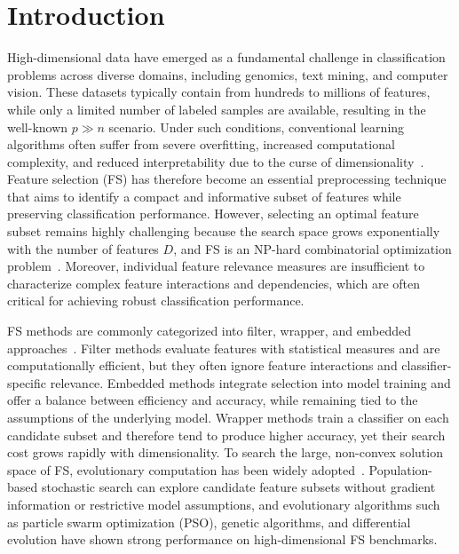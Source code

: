 \section{Introduction}\label{sec:introduction}

High-dimensional data have emerged as a fundamental challenge in classification problems across diverse domains, including genomics, text mining, and computer vision. These datasets typically contain from hundreds to millions of features, while only a limited number of labeled samples are available, resulting in the well-known \(p \gg n\) scenario. Under such conditions, conventional learning algorithms often suffer from severe overfitting, increased computational complexity, and reduced interpretability due to the curse of dimensionality~\cite{lili2017,guyon2003}. Feature selection (FS) has therefore become an essential preprocessing technique that aims to identify a compact and informative subset of features while preserving classification performance. However, selecting an optimal feature subset remains highly challenging because the search space grows exponentially with the number of features \(D\), and FS is an NP-hard combinatorial optimization problem~\cite{liang2025}. Moreover, individual feature relevance measures are insufficient to characterize complex feature interactions and dependencies, which are often critical for achieving robust classification performance.

FS methods are commonly categorized into filter, wrapper, and embedded approaches~\cite{kohavi1997,lili2017}. Filter methods evaluate features with statistical measures and are computationally efficient, but they often ignore feature interactions and classifier-specific relevance. Embedded methods integrate selection into model training and offer a balance between efficiency and accuracy, while remaining tied to the assumptions of the underlying model. Wrapper methods train a classifier on each candidate subset and therefore tend to produce higher accuracy, yet their search cost grows rapidly with dimensionality. To search the large, non-convex solution space of FS, evolutionary computation has been widely adopted~\cite{kennedy1995,shi1998,kennedy1997}. Population-based stochastic search can explore candidate feature subsets without gradient information or restrictive model assumptions, and evolutionary algorithms such as particle swarm optimization (PSO), genetic algorithms, and differential evolution have shown strong performance on high-dimensional FS benchmarks.

